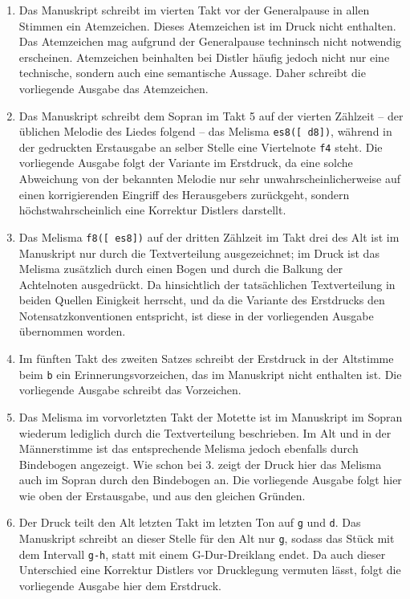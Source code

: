 \documentclass{article}
\begin{document}
\begin{multicols}{2}
\begin{enumerate}
\item
  Das Manuskript schreibt im vierten Takt vor der Generalpause in allen
  Stimmen ein Atemzeichen. Dieses Atemzeichen ist im Druck nicht
  enthalten. Das Atemzeichen mag aufgrund der Generalpause techninsch
  nicht notwendig erscheinen. Atemzeichen beinhalten bei Distler häufig
  jedoch nicht nur eine technische, sondern auch eine semantische
  Aussage. Daher schreibt die vorliegende Ausgabe das Atemzeichen.
\item
  Das Manuskript schreibt dem Sopran im Takt 5 auf der vierten Zählzeit
  -- der üblichen Melodie des Liedes folgend -- das Melisma
  \texttt{es\textquotesingle{}8({[}\ d\textquotesingle{}8{]})}, während
  in der gedruckten Erstausgabe an selber Stelle eine Viertelnote
  \texttt{f\textquotesingle{}4} steht. Die vorliegende Ausgabe folgt der
  Variante im Erstdruck, da eine solche Abweichung von der bekannten
  Melodie nur sehr unwahrscheinlicherweise auf einen korrigierenden
  Eingriff des Herausgebers zurückgeht, sondern höchstwahrscheinlich
  eine Korrektur Distlers darstellt.
\item
  Das Melisma \texttt{f8({[}\ es8{]})} auf der dritten Zählzeit im Takt
  drei des Alt ist im Manuskript nur durch die Textverteilung
  ausgezeichnet; im Druck ist das Melisma zusätzlich durch einen Bogen
  und durch die Balkung der Achtelnoten ausgedrückt. Da hinsichtlich der
  tatsächlichen Textverteilung in beiden Quellen Einigkeit herrscht, und
  da die Variante des Erstdrucks den Notensatzkonventionen entspricht,
  ist diese in der vorliegenden Ausgabe übernommen worden.
\item
  Im fünften Takt des zweiten Satzes schreibt der Erstdruck in der
  Altstimme beim \texttt{b} ein Erinnerungsvorzeichen, das im Manuskript
  nicht enthalten ist. Die vorliegende Ausgabe schreibt das Vorzeichen.
\item
  Das Melisma im vorvorletzten Takt der Motette ist im Manuskript im
  Sopran wiederum lediglich durch die Textverteilung beschrieben. Im Alt
  und in der Männerstimme ist das entsprechende Melisma jedoch ebenfalls
  durch Bindebogen angezeigt. Wie schon bei 3. zeigt der Druck hier das
  Melisma auch im Sopran durch den Bindebogen an. Die vorliegende
  Ausgabe folgt hier wie oben der Erstausgabe, und aus den gleichen
  Gründen.
\item
  Der Druck teilt den Alt letzten Takt im letzten Ton auf \texttt{g} und
  \texttt{d}. Das Manuskript schreibt an dieser Stelle für den Alt nur
  \texttt{g}, sodass das Stück mit dem Intervall \texttt{g-h}, statt mit
  einem G-Dur-Dreiklang endet. Da auch dieser Unterschied eine Korrektur
  Distlers vor Drucklegung vermuten lässt, folgt die vorliegende Ausgabe
  hier dem Erstdruck.
\end{enumerate}


\end{multicols}
\end{document}
